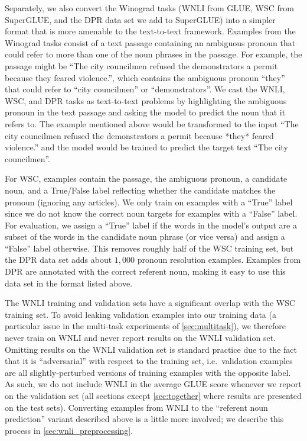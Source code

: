 \documentclass[twoside,11pt]{article}
\begin{document}
Separately, we also convert the Winograd tasks (WNLI from GLUE, WSC from SuperGLUE, and the DPR data set we add to SuperGLUE) into a simpler format that is more amenable to the text-to-text framework.
Examples from the Winograd tasks consist of a text passage containing an ambiguous pronoun that could refer to more than one of the noun phrases in the passage.
For example, the passage might be ``The city councilmen refused the demonstrators a permit because they feared violence.'', which contains the ambiguous pronoun ``they'' that could refer to ``city councilmen'' or ``demonstrators''.
We cast the WNLI, WSC, and DPR tasks as text-to-text problems by highlighting the ambiguous pronoun in the text passage and asking the model to predict the noun that it refers to.
The example mentioned above would be transformed to the input ``The city councilmen refused the demonstrators a permit because *they* feared violence.'' and the model would be trained to predict the target text ``The city councilmen''.

For WSC, examples contain the passage, the ambiguous pronoun, a candidate noun, and a True/False label reflecting whether the candidate matches the pronoun (ignoring any articles).
We only train on examples with a ``True'' label since we do not know the correct noun targets for examples with a ``False'' label.
For evaluation, we assign a ``True'' label if the words in the model's output are a subset of the words in the candidate noun phrase (or vice versa) and assign a ``False'' label otherwise.
This removes roughly half of the WSC training set, but the DPR data set adds about $1{,}000$ pronoun resolution examples.
Examples from DPR are annotated with the correct referent noun, making it easy to use this data set in the format listed above.

The WNLI training and validation sets have a significant overlap with the WSC training set.
To avoid leaking validation examples into our training data (a particular issue in the multi-task experiments of \cref{sec:multitask}), we therefore never train on WNLI and never report results on the WNLI validation set.
Omitting results on the WNLI validation set is standard practice \citep{devlin2018bert} due to the fact that it is ``adversarial'' with respect to the training set, i.e.\ validation examples are all slightly-perturbed versions of training examples with the opposite label.
As such, we do not include WNLI in the average GLUE score whenever we report on the validation set (all sections except \cref{sec:together} where results are presented on the test sets).
Converting examples from WNLI to the ``referent noun prediction'' variant described above is a little more involved; we describe this process in \cref{sec:wnli_preprocessing}.
\end{document}
